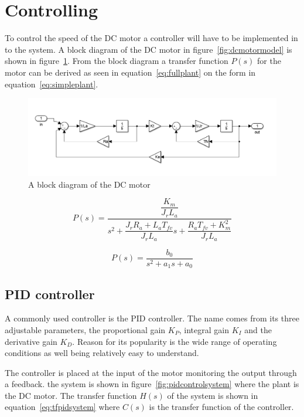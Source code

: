 \section{Controlling}


To control the speed of the DC motor a controller will have to be implemented in to the system. A block diagram of the DC motor in figure~\ref{fig:dcmotormodel} is shown in figure~\ref{fig:dcblock}. From the block diagram a transfer function $P(s)$ for the motor can be derived as seen in equation~\ref{eq:fullplant} on the form in equation~\ref{eq:simpleplant}.

\begin{figure}[!h]
	\centering
	\includegraphics[width=.75\linewidth]{graphics/dcblockdiagram}
	\caption{A block diagram of the DC motor}
	\label{fig:dcblock}
\end{figure}


\begin{equation}
\label{eq:fullplant}
P(s) = \dfrac{\dfrac{K_m}{J_r L_a}}{s^2 + \dfrac{J_r R_a + L_a T_{fv}}{J_r L_a}s + \dfrac{R_a T_{fv} +K_m^2}{J_r L_a}}
\end{equation}

\begin{equation}
\label{eq:simpleplant}
P(s) = \dfrac{b_0}{s^2 + a_1 s + a_0}
\end{equation}


\subsection{PID controller}
 A commonly used controller is the PID controller\cite{feedback}. The name comes from its three adjustable parameters, the proportional gain $K_{P}$, integral gain $K_{I}$ and the derivative gain $K_{D}$. Reason for its popularity is the wide range of operating conditions as well being relatively easy to understand. 
 
 The controller is placed at the input of the motor monitoring the output through a feedback. the system is shown in figure~\ref{fig:pidcontrolsystem} where the plant is the DC motor. The transfer function $H(s)$ of the system is shown in equation~\ref{eq:tfpidsystem} where $C(s)$ is the transfer function of the controller.

